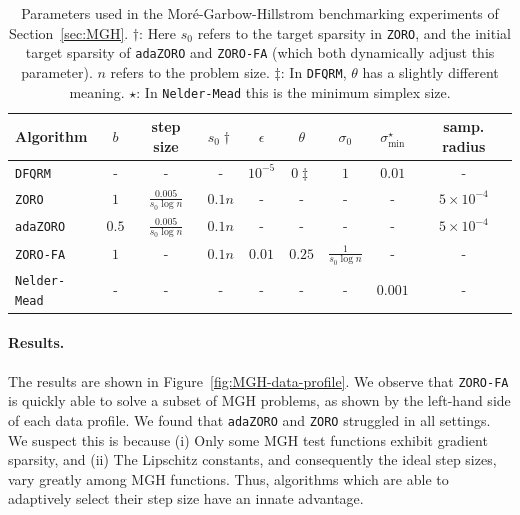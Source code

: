 \begin{table}[ht!]
\def\ROWCOLOR{black!10!white}
\centering
    \begin{tabular}{l c c c c c c c c}
    \toprule
       Algorithm & $b$ & step size & $s_0\dagger$ & $\epsilon$ & $\theta$ &  $\sigma_0$ & $\sigma_{\min}^{\star}$ & samp. radius \\
    \midrule
    \rowcolor{\ROWCOLOR}
    {\tt DFQRM} & - & - & - & $10^{-5}$ & $0\ddagger$ & $1$ & $0.01$  & - \\
    {\tt ZORO} & $1$ & $\frac{0.005}{s_0\log n}$ & $0.1n$ & - & - & - & - & $5\times 10^{-4}$ \\
    \rowcolor{\ROWCOLOR}
    {\tt adaZORO} & $0.5$ & $\frac{0.005}{s_0\log n}$ & $0.1n$ & - & - & - & - & $5\times 10^{-4}$ \\
    {\tt ZORO-FA} & $1$ & - & $0.1n$ & $0.01$ & $0.25$ & $\frac{1}{s_0\log n}$ & - & - \\
    \rowcolor{\ROWCOLOR}
    {\tt Nelder-Mead} & - & - & - & - & - & - & $0.001$ & -\\
    \bottomrule
    \end{tabular}
    \caption{Parameters used in the Mor\'{e}-Garbow-Hillstrom benchmarking experiments of Section~\ref{sec:MGH}. $\dagger$: Here $s_0$ refers to the target sparsity in {\tt ZORO}, and the initial target sparsity of {\tt adaZORO} and {\tt ZORO-FA} (which both dynamically adjust this parameter). $n$ refers to the problem size. $\ddagger$: In {\tt DFQRM}, $\theta$ has a slightly different meaning. $\star$: In {\tt Nelder-Mead} this is the minimum simplex size.}
    \label{table: params_MGH_benchmarking}
\end{table}

\paragraph{Results.} The results are shown in Figure~\ref{fig:MGH-data-profile}. We observe that {\tt ZORO-FA} is quickly able to solve a subset of MGH problems, as shown by the left-hand side of each data profile. We found that {\tt adaZORO} and {\tt ZORO} struggled in all settings. We suspect this is because (i) Only some MGH test functions exhibit gradient sparsity, and (ii) The Lipschitz constants, and consequently the ideal step sizes, vary greatly among MGH functions. Thus, algorithms which are able to adaptively select their step size have an innate advantage.  

